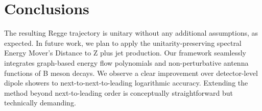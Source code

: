 \section{Conclusions}\label{sec:conclusions}

The resulting Regge trajectory is unitary without any additional
assumptions, as expected. In future work, we plan to apply the
unitarity-preserving spectral Energy Mover's Distance to Z plus jet
production. Our framework seamlessly integrates graph-based energy flow
polynomials and non-perturbative antenna functions of B meson decays. We
observe a clear improvement over detector-level dipole showers to
next-to-next-to-leading logarithmic accuracy. Extending the method
beyond next-to-leading order is conceptually straightforward but
technically demanding.

